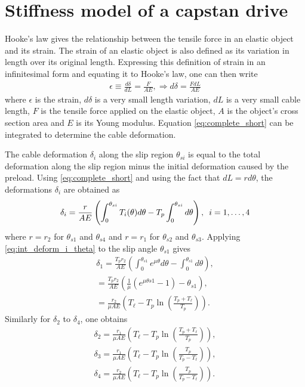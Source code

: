 \documentclass[twocolumn,10pt]{asme2ej}
\newcommand{\hquad}{\hspace{0.5em}}
\begin{document}
\section{Stiffness model of a capstan drive}
Hooke's law gives the relationship between the tensile force in an elastic object and its strain. The strain of an elastic object is also defined as its variation in length over its original length. Expressing this definition of strain in an infinitesimal form and equating it to Hooke's law, one can then write
\begin{align}
\epsilon \equiv \frac{d\delta}{dL} = \frac{F}{AE}, \Rightarrow d\delta = \frac{FdL}{AE}
\label{eq:complete_short}
\end{align}
where $\epsilon$ is the strain, $d\delta$ is a very small length variation, $dL$ is a very small cable length, $F$ is the tensile force applied on the elastic object, $A$ is the object's  cross section area and $E$ is its Young modulus. Equation \eqref{eq:complete_short} can be integrated to determine the cable deformation.
\par
The  cable deformation $\delta_i$ along the slip region $\theta_{si}$ is equal to the total deformation along the slip region minus the initial deformation caused by the preload.  Using \eqref{eq:complete_short} and using the fact that $dL=rd\theta$, the deformations $\delta_i$ are obtained as 
\begin{align}
    \delta_i = \frac{r}{AE}\left(\int_0^{\theta_{si}}T_i(\theta)d\theta-T_p\int_0^{\theta_{si}}d\theta\right),\hquad i=1,\ldots ,4 \label{eq:int_deform_i_theta}
\end{align}
where $r = r_2$ for $\theta_{s1}$ and $\theta_{s4}$ and $r = r_1$ for $\theta_{s2}$ and $\theta_{s3}$.
Applying \eqref{eq:int_deform_i_theta} to the slip angle $\theta_{s1}$ gives
\begin{align}
    \delta_1 = \frac{T_pr_2}{AE}\left(\int_0^{\theta_{s1}}e^{\mu\theta} d\theta-\int_0^{\theta_{s1}}d\theta\right), \\
    = \frac{T_pr_2}{AE}\left(\frac{1}{\mu}\left(e^{\mu\theta{s1}} -1\right)-\theta_{s1}\right),\\
    =\frac{r_2}{\mu AE}\left(T_\ell-T_p\ln\left(\frac{T_p+T_\ell}{T_p}\right)\right)\label{eq:defo1}.
\end{align}
Similarly for $\delta_2$ to $\delta_4$, one obtains 
\begin{align}
    \delta_2=\frac{r_1}{\mu AE}\left(T_\ell-T_p\ln\left(\frac{T_p+T_\ell}{T_p}\right)\right),\label{eq:defo2}\\
    \delta_3= \frac{r_1}{\mu AE}\left(T_\ell-T_p\ln\left(\frac{T_p}{T_p-T_\ell}\right)\right),\label{eq:defo3}\\
    \delta_4 =\frac{r_2}{\mu AE}\left(T_\ell-T_p\ln\left(\frac{T_p}{T_p-T_\ell}\right)\right).\label{eq:defo4}
\end{align}
\end{document}

